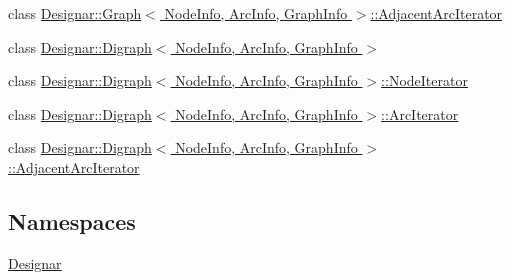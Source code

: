 \begin{DoxyCompactItemize}
\item 
class \hyperlink{class_designar_1_1_graph_1_1_adjacent_arc_iterator}{Designar\+::\+Graph$<$ Node\+Info, Arc\+Info, Graph\+Info $>$\+::\+Adjacent\+Arc\+Iterator}
\item 
class \hyperlink{class_designar_1_1_digraph}{Designar\+::\+Digraph$<$ Node\+Info, Arc\+Info, Graph\+Info $>$}
\item 
class \hyperlink{class_designar_1_1_digraph_1_1_node_iterator}{Designar\+::\+Digraph$<$ Node\+Info, Arc\+Info, Graph\+Info $>$\+::\+Node\+Iterator}
\item 
class \hyperlink{class_designar_1_1_digraph_1_1_arc_iterator}{Designar\+::\+Digraph$<$ Node\+Info, Arc\+Info, Graph\+Info $>$\+::\+Arc\+Iterator}
\item 
class \hyperlink{class_designar_1_1_digraph_1_1_adjacent_arc_iterator}{Designar\+::\+Digraph$<$ Node\+Info, Arc\+Info, Graph\+Info $>$\+::\+Adjacent\+Arc\+Iterator}
\end{DoxyCompactItemize}
\subsection*{Namespaces}
\begin{DoxyCompactItemize}
\item 
 \hyperlink{namespace_designar}{Designar}
\end{DoxyCompactItemize}
